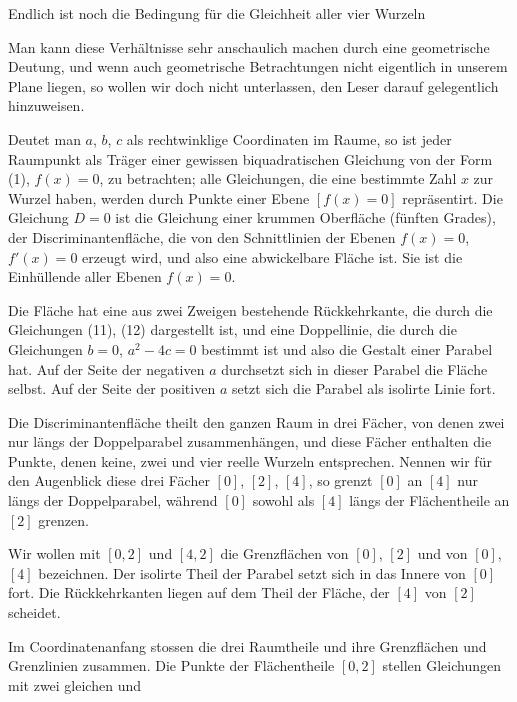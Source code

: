 
Endlich ist noch die Bedingung für die Gleichheit aller vier Wurzeln

Man kann diese Verhältnisse sehr anschaulich machen durch eine geometrische Deutung, und wenn auch geometrische Betrachtungen nicht eigentlich in unserem Plane liegen, so wollen wir doch nicht unterlassen, den Leser darauf gelegentlich hinzuweisen.

Deutet man $a$, $b$, $c$ als rechtwinklige Coordinaten im Raume, so ist jeder Raumpunkt als Träger einer gewissen biquadratischen Gleichung von der Form (1), $f(x) = 0$, zu betrachten; alle Gleichungen, die eine bestimmte Zahl $x$ zur Wurzel haben, werden durch Punkte einer Ebene $[f(x) = 0]$ repräsentirt. Die Gleichung $D = 0$ ist die Gleichung einer krummen Oberfläche (fünften Grades), der Discriminantenfläche, die von den Schnittlinien der Ebenen $f(x) = 0$, $f'(x) = 0$ erzeugt wird, und also eine abwickelbare Fläche ist. Sie ist die Einhüllende aller Ebenen $f(x) = 0$.

Die Fläche hat eine aus zwei Zweigen bestehende Rückkehrkante, die durch die Gleichungen (11), (12) dargestellt ist, und eine Doppellinie, die durch die Gleichungen $b = 0$, $a^2 - 4c = 0$ bestimmt ist und also die Gestalt einer Parabel hat. Auf der Seite der negativen $a$ durchsetzt sich in dieser Parabel die Fläche selbst. Auf der Seite der positiven $a$ setzt sich die Parabel als isolirte Linie fort.

Die Discriminantenfläche theilt den ganzen Raum in drei Fächer, von denen zwei nur längs der Doppelparabel zusammenhängen, und diese Fächer enthalten die Punkte, denen keine, zwei und vier reelle Wurzeln entsprechen. Nennen wir für den Augenblick diese drei Fächer $[0]$, $[2]$, $[4]$, so grenzt $[0]$ an $[4]$ nur längs der Doppelparabel, während $[0]$ sowohl als $[4]$ längs der Flächentheile an $[2]$ grenzen.

Wir wollen mit $[0, 2]$ und $[4, 2]$ die Grenzflächen von $[0]$, $[2]$ und von $[0]$, $[4]$ bezeichnen. Der isolirte Theil der Parabel setzt sich in das Innere von $[0]$ fort. Die Rückkehrkanten liegen auf dem Theil der Fläche, der $[4]$ von $[2]$ scheidet.

Im Coordinatenanfang stossen die drei Raumtheile und ihre Grenzflächen und Grenzlinien zusammen. Die Punkte der Flächentheile $[0, 2]$ stellen Gleichungen mit zwei gleichen und
